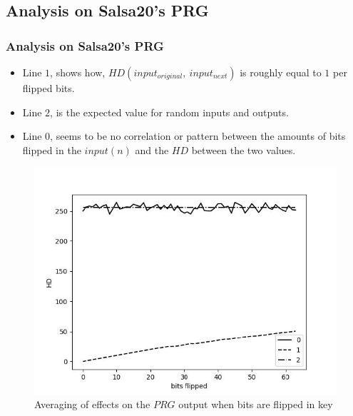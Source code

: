 \subsection{Analysis on Salsa20’s PRG}
\begin{frame}
\frametitle{Analysis on Salsa20's PRG}

\setlength{\columnsep}{10pt}
\begin{multicols}{2}
\setlength{\leftmargin}{1pt}

{\begin{itemize}
    \item \small{Line $1$, shows how, $HD(input_{original}, \ input_{next})$ is roughly equal to $1$ per flipped bits.}
    \item \small{Line $2$, is the expected value for random inputs and outputs.}
    \item \small{Line $0$, seems to be no correlation or pattern between the amounts of bits flipped in the $input(n)$ and the $HD$ between the two values.}
\end{itemize}}

\columnbreak
\setlength{\rightmargin}{0pt}
\begin{figure}
    \centering
    \includegraphics[scale=0.55]{fig3.jpg}
    \caption{Averaging of effects on the $PRG$ output when bits are 
flipped in key}
\end{figure}

\end{multicols}

\end{frame}
